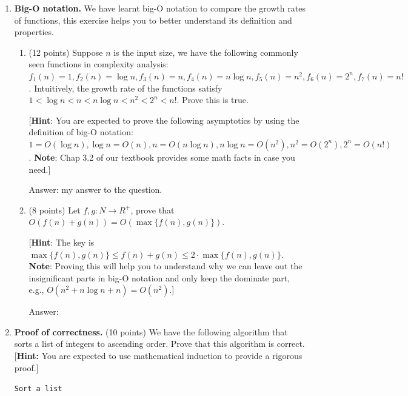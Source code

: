 \documentclass[12pt]{article}
\begin{document}
\begin{enumerate}

  \item \textbf{Big-O notation.} We have learnt big-O notation to compare the growth rates of functions, this exercise helps you to better understand its definition and properties.
  \begin{enumerate}
  	\item (12 points) Suppose $n$ is the input size, we have the following commonly seen functions in complexity analysis: $f_1(n)=1, f_2(n)=\log n, f_3(n)=n, f_4(n)=n\log n, f_5(n)=n^2, f_6(n)=2^n, f_7(n)=n!$. Intuitively, the growth rate of the functions satisfy $1<\log n<n<n\log n<n^2<2^n<n!$. Prove this is true. 
	
	[\textbf{Hint}: You are expected to prove the following asymptotics by using the definition of big-O notation: $1=O(\log n), \log n=O(n), n=O(n\log n), n\log n=O(n^2), n^2=O(2^n), 2^n=O(n!)$. \textbf{Note}: Chap 3.2 of our textbook provides some math facts in case you need.]

	{\color{blue}Answer: my answer to the question.}

	\item (8 points) Let $f,g:N\rightarrow R^+$, prove that $O(f(n)+g(n))=O(\max\{f(n),g(n)\})$.
	
	[\textbf{Hint}: The key is $\max\{f(n),g(n)\}\le f(n)+g(n)\le 2\cdot\max\{f(n),g(n)\}$. \textbf{Note}: Proving this will help you to understand why we can leave out the insignificant parts in big-O notation and only keep the dominate part, e.g., $O(n^2+n\log n+n)=O(n^2)$.]
	
	{\color{blue}Answer: }
	
  \end{enumerate}

  \item \textbf{Proof of correctness.} (10 points) We have the following algorithm that sorts a list of integers to ascending order. Prove that this algorithm is correct. [\textbf{Hint:} You are expected to use mathematical induction to provide a rigorous proof.]
    \begin{algorithm}
      \caption{\texttt{Sort a list}}
    \end{algorithm}


\end{enumerate}
\end{document}
